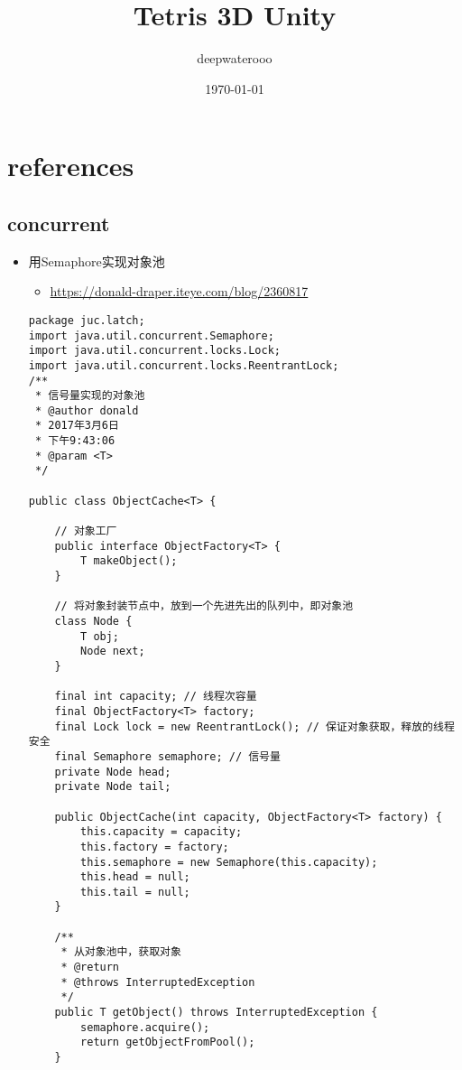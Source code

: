 \documentclass[9pt, b5paper]{article}
\author{deepwaterooo}
\date{\today}
\title{Tetris 3D Unity}
\begin{document}
\maketitle
\tableofcontents


\section{references}
\label{sec-1}
\subsection{concurrent}
\label{sec-1-1}
\begin{itemize}
\item 用Semaphore实现对象池
\begin{itemize}
\item \url{https://donald-draper.iteye.com/blog/2360817}
\end{itemize}
\begin{verbatim}
package juc.latch;  
import java.util.concurrent.Semaphore;  
import java.util.concurrent.locks.Lock;  
import java.util.concurrent.locks.ReentrantLock;  
/** 
 * 信号量实现的对象池 
 * @author donald 
 * 2017年3月6日 
 * 下午9:43:06 
 * @param <T> 
 */

public class ObjectCache<T> {  

    // 对象工厂  
    public interface ObjectFactory<T> {  
        T makeObject();  
    }  

    // 将对象封装节点中，放到一个先进先出的队列中，即对象池  
    class Node {  
        T obj;  
        Node next;  
    }
    
    final int capacity; // 线程次容量  
    final ObjectFactory<T> factory;  
    final Lock lock = new ReentrantLock(); // 保证对象获取，释放的线程安全  
    final Semaphore semaphore; // 信号量  
    private Node head;  
    private Node tail;
    
    public ObjectCache(int capacity, ObjectFactory<T> factory) {  
        this.capacity = capacity;  
        this.factory = factory;  
        this.semaphore = new Semaphore(this.capacity);  
        this.head = null;  
        this.tail = null;  
    }  

    /** 
     * 从对象池中，获取对象 
     * @return 
     * @throws InterruptedException 
     */  
    public T getObject() throws InterruptedException {  
        semaphore.acquire();  
        return getObjectFromPool();  
    }
    

\end{verbatim}
\end{itemize}
\end{document}
